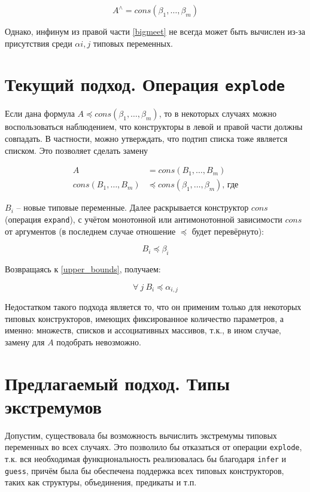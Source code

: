 \documentclass[10pt,russian]{article}
\newcommand{\subtype}{\preccurlyeq}
\begin{document}
\begin{equation*}
A^{\wedge} = cons(\beta_1, \dotsc, \beta_m)
\end{equation*}

Однако, инфинум из правой части \eqref{bigmeet} не всегда может быть вычислен
из-за присутствия среди $\alpha{i,j}$ типовых переменных.

\section{Текущий подход. Операция \texttt{explode}}

Если дана формула $A \subtype cons(\beta_1, \dotsc, \beta_m)$, то в
некоторых случаях можно воспользоваться наблюдением, что конструкторы в левой и
правой части должны совпадать. В частности, можно утверждать, что подтип списка
тоже является списком. Это позволяет сделать замену

\begin{align*}
A &= cons(B_1, \dotsc, B_m) \\
cons(B_1, \dotsc, B_m) &\subtype cons(\beta_1, \dotsc, \beta_m) \text{, где}
\end{align*}

$B_i$ -- новые типовые переменные. Далее раскрывается конструктор $cons$
(операция \texttt{expand}), с учётом монотонной или антимонотонной зависимости
$cons$ от аргументов (в последнем случае отношение $\subtype$ будет
перевёрнуто):

\begin{equation*}
B_i \subtype \beta_i
\end{equation*}

Возвращаясь к \eqref{upper_bounds}, получаем:

\begin{equation*}
\forall ~ j ~ B_i \subtype \alpha_{i,j}
\end{equation*}

Недостатком такого подхода является то, что он применим только для некоторых
типовых конструкторов, имеющих фиксированное количество параметров, а именно:
множеств, списков и ассоциативных массивов, т.к., в ином случае, замену для $A$
подобрать невозможно.

\section{Предлагаемый подход. Типы экстремумов}

Допустим, существовала бы возможность вычислить экстремумы типовых переменных
во всех случаях. Это позволило бы отказаться от операции \texttt{explode}, т.к.
вся необходимая функциональность реализовалась бы благодаря \texttt{infer} и
\texttt{guess}, причём была бы обеспечена поддержка всех типовых конструкторов,
таких как структуры, объединения, предикаты и т.п.
\end{document}

